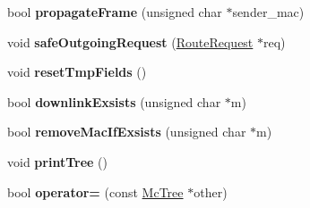 \begin{DoxyCompactItemize}
\item 
\hypertarget{classMcTree_acee7fd958591ea6a7bb1cfed4a166812}{bool {\bfseries propagate\-Frame} (unsigned char $\ast$sender\-\_\-mac)}\label{classMcTree_acee7fd958591ea6a7bb1cfed4a166812}

\item 
\hypertarget{classMcTree_a68de6f320a8900bee7cd1a17ba608778}{void {\bfseries safe\-Outgoing\-Request} (\hyperlink{classRouteRequest}{Route\-Request} $\ast$req)}\label{classMcTree_a68de6f320a8900bee7cd1a17ba608778}

\item 
\hypertarget{classMcTree_ac7a21fd806fa9c0c825d0c9e2f6037cc}{void {\bfseries reset\-Tmp\-Fields} ()}\label{classMcTree_ac7a21fd806fa9c0c825d0c9e2f6037cc}

\item 
\hypertarget{classMcTree_a4e627637f66a8a2768036245e8fe7a1b}{bool {\bfseries downlink\-Exsists} (unsigned char $\ast$m)}\label{classMcTree_a4e627637f66a8a2768036245e8fe7a1b}

\item 
\hypertarget{classMcTree_ae4596d618fba858d96441701b95286dc}{bool {\bfseries remove\-Mac\-If\-Exsists} (unsigned char $\ast$m)}\label{classMcTree_ae4596d618fba858d96441701b95286dc}

\item 
\hypertarget{classMcTree_a5fcf06613c9e3b5e3d007750d85d957d}{void {\bfseries print\-Tree} ()}\label{classMcTree_a5fcf06613c9e3b5e3d007750d85d957d}

\item 
\hypertarget{classMcTree_ac81005763adb448558d664e36e512ecf}{bool {\bfseries operator=} (const \hyperlink{classMcTree}{Mc\-Tree} $\ast$other)}\label{classMcTree_ac81005763adb448558d664e36e512ecf}

\end{DoxyCompactItemize}
